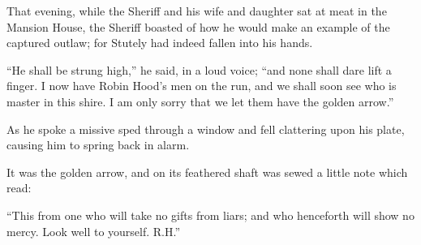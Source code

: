 That evening, while the Sheriff and his wife and daughter sat at meat in
the Mansion House, the Sheriff boasted of how he would make an example
of the captured outlaw; for Stutely had indeed fallen into his hands.

``He shall be strung high,'' he said, in a loud voice; ``and none shall
dare lift a finger. I now have Robin Hood's men on the run, and we shall
soon see who is master in this shire. I am only sorry that we let them
have the golden arrow.''

As he spoke a missive sped through a window and fell clattering upon his
plate, causing him to spring back in alarm.

It was the golden arrow, and on its feathered shaft was sewed a little
note which read:

``This from one who will take no gifts from liars; and who henceforth
will show no mercy. Look well to yourself. R.H.''
